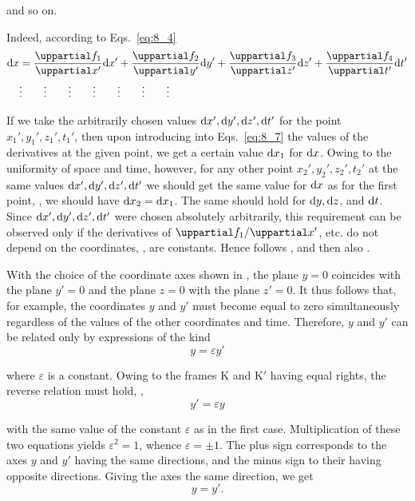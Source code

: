 \noindent
and so on.

Indeed, according to Eqs.~\eqref{eq:8_4}
\begin{align}
	\deriv{x} &= \diffpartial{f_1}{x'}\deriv{x'} + \diffpartial{f_2}{y'}\deriv{y'} + \diffpartial{f_3}{z'}\deriv{z'} + \diffpartial{f_4}{t'}\deriv{t'}\label{eq:8_7}\\
	&\vdots\quad\quad\vdots\quad\quad\vdots\quad\quad\vdots\quad\quad\vdots\quad\quad\vdots\quad\quad\vdots\nonumber
\end{align}

\noindent
If we take the arbitrarily chosen values $\mathrm{d} x', \mathrm{d} y', \mathrm{d} z', \mathrm{d} t'$ for the point $x_1', y_1', z_1', t_1'$, then upon introducing into Eqs.~\eqref{eq:8_7} the values of the derivatives at the given point, we get a certain value $\mathrm{d} x_1$ for $\mathrm{d} x$. Owing to the uniformity of space and time, however, for any other point $x_2', y_2', z_2', t_2'$ at the same values $\mathrm{d} x', \mathrm{d} y', \mathrm{d} z', \mathrm{d} t'$ we should get the same value for $\mathrm{d} x$ as for the first point, \ie, we should have $\mathrm{d} x_2=\mathrm{d} x_1$. The same should hold for $\mathrm{d} y, \mathrm{d} z$, and $\mathrm{d} t$. Since $\mathrm{d} x', \mathrm{d} y', \mathrm{d} z', \mathrm{d} t'$ were chosen absolutely arbitrarily, this requirement can be observed only if the derivatives of $\diffinpartial{f_1}{x'}$, etc. do not depend on the coordinates, \ie, are constants. Hence follows , and then also .

With the choice of the coordinate axes shown in , the plane $y=0$ coincides with the plane $y'=0$ and the plane $z=0$ with the plane $z'=0$. It thus follows that, for example, the coordinates $y$ and $y'$ must become equal to zero simultaneously regardless of the values of the other coordinates and time. Therefore, $y$ and $y'$ can be related only by expressions of the kind
\begin{equation*}
	y = \varepsilon y'
\end{equation*}

\noindent
where $\varepsilon$ is a constant. Owing to the frames K and K$'$ having equal rights, the reverse relation must hold, \ie,
\begin{equation*}
	y' = \varepsilon y
\end{equation*}

\noindent
with the same value of the constant $\varepsilon$ as in the first case. Multiplication of these two equations yields $\varepsilon^2 = 1$, whence $\varepsilon=\pm 1$. The plus sign corresponds to the axes $y$ and $y'$ having the same directions, and the minus sign to their having opposite directions. Giving the axes the same direction, we get
\begin{equation}\label{eq:8_8}
	y = y'.
\end{equation}

